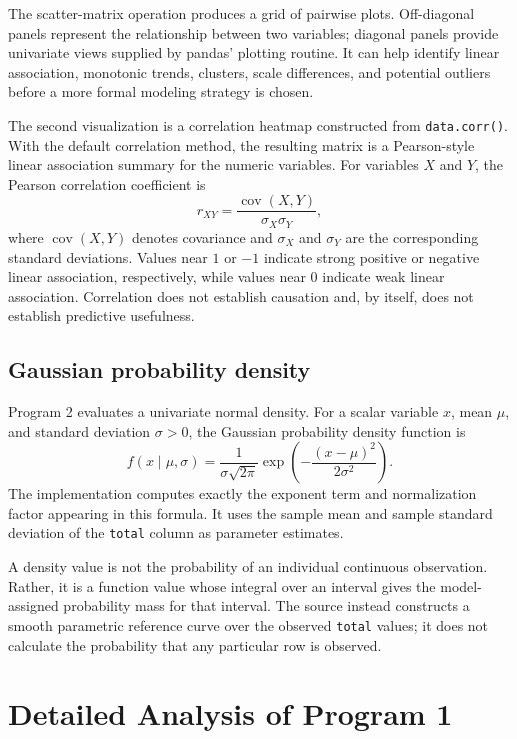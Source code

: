 \documentclass[11pt,a4paper]{article}
\begin{document}
The scatter-matrix operation produces a grid of pairwise plots. Off-diagonal panels represent the relationship between two variables; diagonal panels provide univariate views supplied by pandas' plotting routine. It can help identify linear association, monotonic trends, clusters, scale differences, and potential outliers before a more formal modeling strategy is chosen.

The second visualization is a correlation heatmap constructed from \texttt{data.corr()}. With the default correlation method, the resulting matrix is a Pearson-style linear association summary for the numeric variables. For variables $X$ and $Y$, the Pearson correlation coefficient is
\begin{equation}
 r_{XY} = \frac{\operatorname{cov}(X,Y)}{\sigma_X\sigma_Y},
\end{equation}
where $\operatorname{cov}(X,Y)$ denotes covariance and $\sigma_X$ and $\sigma_Y$ are the corresponding standard deviations. Values near $1$ or $-1$ indicate strong positive or negative linear association, respectively, while values near $0$ indicate weak linear association. Correlation does not establish causation and, by itself, does not establish predictive usefulness.

\subsection{Gaussian probability density}
Program 2 evaluates a univariate normal density. For a scalar variable $x$, mean $\mu$, and standard deviation $\sigma>0$, the Gaussian probability density function is
\begin{equation}
 f(x\mid\mu,\sigma)
 = \frac{1}{\sigma\sqrt{2\pi}}
 \exp\!\left(-\frac{(x-\mu)^2}{2\sigma^2}\right).
\end{equation}
The implementation computes exactly the exponent term and normalization factor appearing in this formula. It uses the sample mean and sample standard deviation of the \texttt{total} column as parameter estimates.

A density value is not the probability of an individual continuous observation. Rather, it is a function value whose integral over an interval gives the model-assigned probability mass for that interval. The source instead constructs a smooth parametric reference curve over the observed \texttt{total} values; it does not calculate the probability that any particular row is observed.

\section{Detailed Analysis of Program 1}
\end{document}
